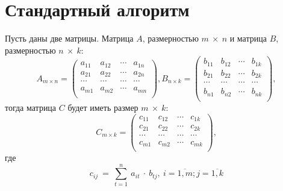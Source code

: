 \section{Стандартный алгоритм}
Пусть даны две матрицы. Матрица $A$, размерностью $m~\times~n$ и матрица $B$, размерностью $n~\times~k$:
\begin{equation}
	A_{m \times n}=\begin{pmatrix}
		a_{11} & a_{12} & \cdots & a_{1n} \\
		a_{21} & a_{22} & \cdots & a_{2n} \\
		\cdots & \cdots & \cdots & \cdots \\
		a_{m1} & a_{m2} & \cdots & a_{mn} \\
	\end{pmatrix},
	B_{n \times k}=\begin{pmatrix}
		b_{11} & b_{12} & \cdots & b_{1k} \\
		b_{21} & b_{22} & \cdots & b_{2k} \\
		\cdots & \cdots & \cdots & \cdots \\
		b_{n1} & b_{n2} & \cdots & b_{nk} \\
	\end{pmatrix},
\end{equation}
\noindent тогда матрица $C$ будет иметь размер $m~\times~k$:
\begin{equation}
	C_{m \times k}=\begin{pmatrix}
		c_{11} & c_{12} & \cdots & c_{1k} \\
		c_{21} & c_{22} & \cdots & c_{2k} \\
		\cdots & \cdots & \cdots & \cdots \\
		c_{m1} & c_{m2} & \cdots & c_{mk} \\
	\end{pmatrix},
\end{equation}
\noindent где
\begin{equation}
	\label{std_mult_eq}
	c_{ij}~=~\sum_{t=1}^{n}~a_{it}~\cdot~b_{tj},~i=\overline{1,m}; j=\overline{1,k}
\end{equation}


